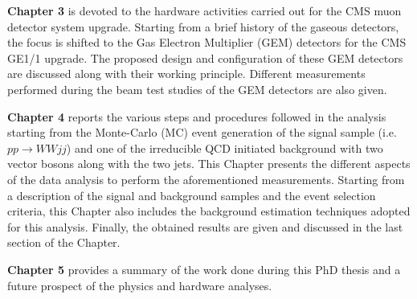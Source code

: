 \textbf{Chapter 3} is devoted to the hardware activities carried out for the CMS muon detector system upgrade. Starting from a brief history of the gaseous detectors, the focus is shifted to the Gas Electron Multiplier (GEM) detectors for the CMS GE1/1 upgrade. The proposed design and configuration of these GEM detectors are discussed along with their working principle. Different measurements performed during the beam test studies of the GEM detectors are also given.

\textbf{Chapter 4} reports the various steps and procedures followed in the analysis starting from the Monte-Carlo (MC) event generation of the signal sample (i.e. $pp \rightarrow WWjj$) and one of the irreducible QCD initiated background with two vector bosons along with the two jets. This Chapter presents the different aspects of the data analysis to perform the aforementioned measurements. Starting from a description of the signal and background samples and the event selection criteria, this Chapter also includes the background estimation techniques adopted for this analysis. Finally, the obtained results are given and discussed in the last section of the Chapter.

\textbf{Chapter 5} provides a summary of the work done during this PhD thesis and a future prospect of the physics and hardware analyses.